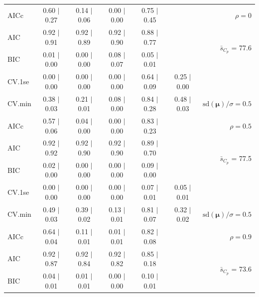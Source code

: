 \documentclass[12pt]{article}
\newcommand{\mr}[1]{\mathrm{#1}}
\newcommand{\bm}[1]{\mathbf{#1}}
\begin{document}
\begin{table}[p]
\begin{center}
\begin{tabular}{l*{5}{c}|r}
AICc & 0.60 $\mid$ 0.27 & 0.14 $\mid$ 0.06 & 0.00 $\mid$ 0.00 & 0.75 $\mid$ 0.45 & & $\rho=0$ \\
AIC & 0.92 $\mid$ 0.91 & 0.92 $\mid$ 0.89 & 0.92 $\mid$ 0.90 & 0.88 $\mid$ 0.77 & & \multirow{2}{*}{$\bar{s}_{C_p}$ = 77.6} \\
BIC & 0.01 $\mid$ 0.00 & 0.00 $\mid$ 0.00 & 0.08 $\mid$ 0.07 & 0.05 $\mid$ 0.01 & & \\
 \hline 
CV.1se & 0.00 $\mid$ 0.00 & 0.00 $\mid$ 0.00 & 0.00 $\mid$ 0.00 & 0.64 $\mid$ 0.09 & 0.25 $\mid$ 0.00 &\\
CV.min & 0.38 $\mid$ 0.03 & 0.21 $\mid$ 0.01 & 0.08 $\mid$ 0.00 & 0.84 $\mid$ 0.28 & 0.48 $\mid$ 0.03 &  $\mr{sd}(\bm{\mu})/\sigma=0.5$ \\
AICc & 0.57 $\mid$ 0.06 & 0.04 $\mid$ 0.00 & 0.00 $\mid$ 0.00 & 0.83 $\mid$ 0.23 & & $\rho=0.5$ \\
AIC & 0.92 $\mid$ 0.92 & 0.92 $\mid$ 0.90 & 0.92 $\mid$ 0.90 & 0.89 $\mid$ 0.70 & & \multirow{2}{*}{$\bar{s}_{C_p}$ = 77.5} \\
BIC & 0.02 $\mid$ 0.00 & 0.00 $\mid$ 0.00 & 0.00 $\mid$ 0.00 & 0.09 $\mid$ 0.00 & & \\
 \hline 
CV.1se & 0.00 $\mid$ 0.00 & 0.00 $\mid$ 0.00 & 0.00 $\mid$ 0.00 & 0.07 $\mid$ 0.01 & 0.05 $\mid$ 0.01 &\\
CV.min & 0.49 $\mid$ 0.03 & 0.39 $\mid$ 0.02 & 0.13 $\mid$ 0.01 & 0.81 $\mid$ 0.07 & 0.32 $\mid$ 0.02 &  $\mr{sd}(\bm{\mu})/\sigma=0.5$ \\
AICc & 0.64 $\mid$ 0.04 & 0.11 $\mid$ 0.01 & 0.01 $\mid$ 0.01 & 0.82 $\mid$ 0.08 & & $\rho=0.9$ \\
AIC & 0.92 $\mid$ 0.87 & 0.92 $\mid$ 0.84 & 0.92 $\mid$ 0.82 & 0.85 $\mid$ 0.18 & & \multirow{2}{*}{$\bar{s}_{C_p}$ = 73.6} \\
BIC & 0.04 $\mid$ 0.01 & 0.01 $\mid$ 0.01 & 0.00 $\mid$ 0.00 & 0.10 $\mid$ 0.01 & & \\
 \hline 
 \end{tabular}
\end{center}
\vspace{-1cm}
\end{table}
\end{document}
